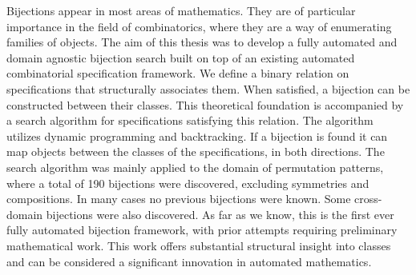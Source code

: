 Bijections appear in most areas of mathematics. They are of particular importance in the field of combinatorics, where they are a way of enumerating families of objects. The aim of this thesis was to develop a fully automated and domain agnostic bijection search built on top of an existing automated combinatorial specification framework. We define a binary relation on specifications that structurally associates them. When satisfied, a bijection can be constructed between their classes. This theoretical foundation is accompanied by a search algorithm for specifications satisfying this relation. The algorithm utilizes dynamic programming and backtracking. If a bijection is found it can map objects between the classes of the specifications, in both directions. The search algorithm was mainly applied to the domain of permutation patterns, where a total of 190 bijections were discovered, excluding symmetries and compositions. In many cases no previous bijections were known. Some cross-domain bijections were also discovered. As far as we know, this is the first ever fully automated bijection framework, with prior attempts requiring preliminary mathematical work. This work offers substantial structural insight into classes and can be considered a significant innovation in automated mathematics.




